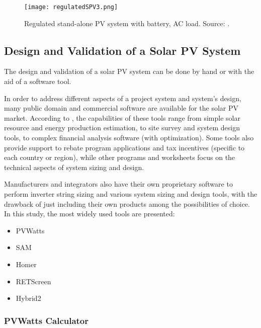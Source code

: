 \begin{figure}[h]
\texttt{[image: regulatedSPV3.png]}
\centering
\caption{Regulated stand-alone PV system with battery, AC load. Source: \cite{Roy}.}
\label{fig:regSPV3}
\end{figure}

\subsection{Design and Validation of a Solar PV System}

The design and validation of a solar PV system can be done by hand or with the aid of a software tool. 

In order to address different aspects of a project system and system's design, many public domain and commercial software are available for the solar PV market. According to \cite{Brooks}, the capabilities of these tools range from simple solar resource and energy production estimation, to site survey and system design tools, to complex financial analysis software (with optimization). Some tools also provide support to rebate program applications and tax incentives (specific to each country or region), while other programs and worksheets focus on the technical aspects of system sizing and design.
 
Manufacturers and integrators also have their own proprietary software to perform inverter string sizing and various system sizing and design tools, with the drawback of just including their own products among the possibilities of choice. In this study, the most widely used tools are presented: 

\begin{itemize}
\item PVWatts 
\item SAM
\item Homer
\item RETScreen
\item Hybrid2
\end{itemize}

\subsubsection{PVWatts Calculator}


